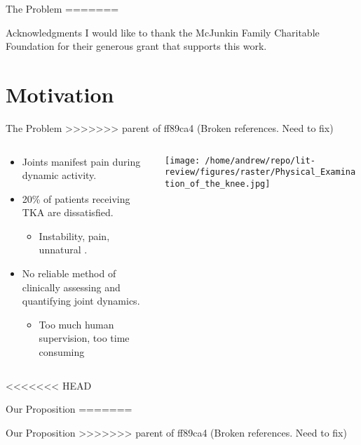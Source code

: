 \documentclass[presentation, aspectratio=1610]{beamer}
\begin{document}
\begin{frame}[label={sec:org51bdd62}]{The Problem}
=======
\label{sec:org67b971e}
\begin{frame}[label={sec:org1dd3e2b}]{Acknowledgments}
I would like to thank the McJunkin Family Charitable Foundation for their generous grant that supports this work.
\end{frame}
\section{Motivation}
\label{sec:org94c169f}
\begin{frame}[label={sec:orga7d9dd4}]{The Problem}
>>>>>>> parent of ff89ca4 (Broken references. Need to fix)
\begin{columns}
\begin{column}{0.5\columnwidth}
\begin{itemize}
\item Joints manifest pain during dynamic activity.
\item 20\% of patients receiving TKA are dissatisfied.
\begin{itemize}
\item Instability, pain, unnatural \autocites{bakerRolePainFunction2007}[][]{bournePatientSatisfactionTotal2010}[][]{scottPredictingDissatisfactionFollowing2010}.
\end{itemize}
\item No reliable method of clinically assessing and quantifying joint dynamics.
\begin{itemize}
\item Too much human supervision, too time consuming
\end{itemize}
\end{itemize}
\end{column}
\begin{column}{0.5\columnwidth}
\begin{center}
\texttt{[image: /home/andrew/repo/lit-review/figures/raster/Physical\_Examination\_of\_the\_knee.jpg]}
\end{center}
\end{column}
\end{columns}
\end{frame}
<<<<<<< HEAD
\begin{frame}[label={sec:org827823c}]{Our Proposition}
=======
\begin{frame}[label={sec:org1b6f1a3}]{Our Proposition}
>>>>>>> parent of ff89ca4 (Broken references. Need to fix)
\begin{columns}

\end{columns}
\end{frame}
\end{frame}
\end{frame}
\end{document}
